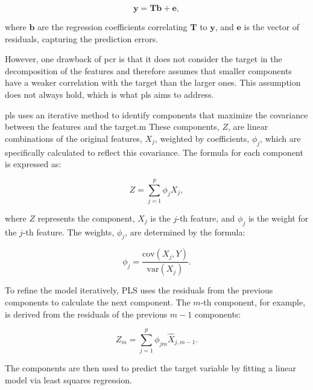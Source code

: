$$
\mathbf{y} = \mathbf{Tb} + \mathbf{e},
$$

where $\mathbf{b}$ are the regression coefficients correlating $\mathbf{T}$ to $\mathbf{y}$, and $\mathbf{e}$ is the vector of residuals, capturing the prediction errors.

However, one drawback of \gls{pcr} is that it does not consider the target in the decomposition of the features and therefore assumes that smaller components have a weaker correlation with the target than the larger ones.
This assumption does not always hold, which is what \gls{pls} aims to address.

\gls{pls} uses an iterative method to identify components that maximize the covariance between the features and the target.m
These components, $Z$, are linear combinations of the original features, $X_j$, weighted by coefficients, $\phi_j$, which are specifically calculated to reflect this covariance.
The formula for each component is expressed as:

$$
    Z = \sum_{j=1}^{p} \phi_j X_j,
$$

where $Z$ represents the component, $X_j$ is the $j$-th feature, and $\phi_j$ is the weight for the $j$-th feature.
The weights, $\phi_j$, are determined by the formula:

$$
    \phi_j = \frac{\text{cov}(X_j, Y)}{\text{var}(X_j)}.
$$

To refine the model iteratively, PLS uses the residuals from the previous components to calculate the next component.
The $m$-th component, for example, is derived from the residuals of the previous $m-1$ components:

$$
    Z_m = \sum_{j=1}^{p} \phi_{jm} \hat{X}_{j, m-1}.
$$

The components are then used to predict the target variable by fitting a linear model via least squares regression.\cite{James2023AnIS}
